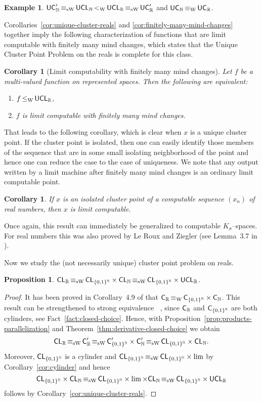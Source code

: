 \documentclass[a4paper]{amsart}
\def\IN{{\mathbb{N}}}
\def\IR{{\mathbb{R}}}
\def\Cantor{{\{0,1\}^\IN}}
\def\C{\mbox{\rm\sffamily C}}
\def\UC{\mbox{\rm\sffamily UC}}
\def\CL{\text{\rm\sffamily CL}}
\def\UCL{\text{\rm\sffamily UCL}}
\def\leqW{\mathop{\leq_{\mathrm{W}}}}
\def\equivW{\mathop{\equiv_{\mathrm{W}}}}
\def\equivSW{\mathop{\equiv_{\mathrm{sW}}}}
\def\lW{\mathop{<_{\mathrm{W}}}}
\newtheorem{proposition}[theorem]{Proposition}
\newtheorem{corollary}[theorem]{Corollary}
\theoremstyle{definition}
\newtheorem{example}[theorem]{Example}
\begin{document}
\begin{example}
\label{ex:UCL-R}
$\UC_\IN'\equivSW\UCL_\IN\lW\UCL_\IR\equivSW\UC_\IR'$ and $\UC_\IN\equivW\UC_\IR$.
\end{example}

Corollaries~\ref{cor:unique-cluster-reals} and \ref{cor:finitely-many-mind-changes} together imply 
the following characterization of functions that are limit computable with finitely many mind changes,
which states that the Unique Cluster Point Problem on the reals is complete for this class.

\begin{corollary}[Limit computability with finitely many mind changes]
\label{cor:limit-finitely-many-mind-changes}
Let $f$ be a multi-valued function on represented spaces. 
Then the following are equivalent:
\begin{enumerate}
\item $f\leqW\UCL_\IR$,
\item $f$ is limit computable with finitely many mind changes.
\end{enumerate}
\end{corollary}

That leads to the following corollary, which is clear when $x$ is a unique
cluster point. If the cluster point is isolated, then one can easily identify
those members of the sequence that are in some small isolating neighborhood
of the point and hence one can reduce the case to the case of uniqueness.
We note that any output written by a limit machine after finitely many mind changes
is an ordinary limit computable point.

\begin{corollary}
\label{cor:cluster-limit}
If $x$ is an isolated cluster point of a computable sequence $(x_n)$ of real numbers, then $x$ is limit computable.
\end{corollary}

Once again, this result can immediately be generalized to computable $K_\sigma$--spaces.
For real numbers this was also proved by Le Roux and Ziegler (see Lemma~3.7 in \cite{LZ08a}).

Now we study the (not necessarily unique) cluster point problem on reals.

\begin{proposition}
$\CL_\IR\equivSW\CL_\Cantor\times\CL_\IN\equivSW\CL_\Cantor\times\UCL_\IR$.
\end{proposition}
\begin{proof}
It has been proved in Corollary~4.9 of \cite{BBP} that $\C_\IR\equivW\C_\Cantor\times\C_\IN$.
This result can be strengthened to strong equivalence $\equivSW$, since $\C_\IR$ and $\C_\Cantor$
are both cylinders, see Fact~\ref{fact:closed-choice}.
Hence, with Proposition~\ref{prop:products-parallelization} and Theorem~\ref{thm:derivative-closed-choice}
we obtain
\[\CL_\IR\equivSW\C_\IR'\equivSW\C_\Cantor'\times\C_\IN'\equivSW\CL_\Cantor\times\CL_\IN.\]
Moreover, $\CL_\Cantor$ is a cylinder and $\CL_\Cantor\equivSW\CL_\Cantor\times\lim$
by Corollary~\ref{cor:cylinder} and hence 
\[\CL_\Cantor\times\CL_\IN\equivSW\CL_\Cantor\times\lim\times\CL_\IN\equivSW\CL_\Cantor\times\UCL_\IR\]
follows by Corollary~\ref{cor:unique-cluster-reals}.
\end{proof}
\end{document}

